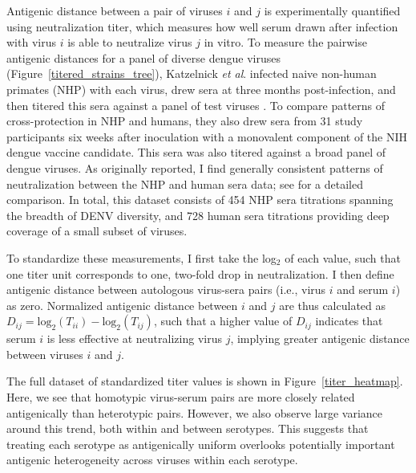 Antigenic distance between a pair of viruses $i$ and $j$ is experimentally quantified using neutralization titer, which measures how well serum drawn after infection with virus $i$ is able to neutralize virus $j$ in vitro\citep{russell1967dengue}.
To measure the pairwise antigenic distances for a panel of diverse dengue viruses (Figure~\ref{titered_strains_tree}), Katzelnick \textit{et al}. infected naive non-human primates (NHP) with each virus, drew sera at three months post-infection, and then titered this sera against a panel of test viruses \citep{katzelnick2015dengue}.
To compare patterns of cross-protection in NHP and humans, they also drew sera from 31 study participants six weeks after inoculation with a monovalent component of the NIH dengue vaccine candidate.
This sera was also titered against a broad panel of dengue viruses.
As originally reported, I find generally consistent patterns of neutralization between the NHP and human sera data; see \citep{katzelnick2015dengue} for a detailed comparison.
In total, this dataset consists of 454 NHP sera titrations spanning the breadth of DENV diversity, and 728 human sera titrations providing deep coverage of a small subset of viruses.

To standardize these measurements, I first take the log$_2$ of each value, such that one titer unit corresponds to one, two-fold drop in neutralization.
I then define antigenic distance between autologous virus-sera pairs (i.e., virus $i$ and serum $i$) as zero.
Normalized antigenic distance between $i$ and $j$ are thus calculated as $D_{ij} = \mathrm{log}_2(T_{ii}) - \mathrm{log}_2(T_{ij})$, such that a higher value of $D_{ij}$ indicates that serum $i$ is less effective at neutralizing virus $j$, implying greater antigenic distance between viruses $i$ and $j$.

The full dataset of standardized titer values is shown in Figure~\ref{titer_heatmap}.
Here, we see that homotypic virus-serum pairs are more closely related antigenically than heterotypic pairs.
However, we also observe large variance around this trend, both within and between serotypes.
This suggests that treating each serotype as antigenically uniform overlooks potentially important antigenic heterogeneity across viruses within each serotype.

